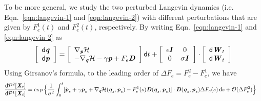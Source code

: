 \documentclass[aip,jcp,a4paper,reprint,onecolumn]{revtex4-1}
\newcommand{\vect}[1]{\textbf{\textit{#1}}}
\newcommand{\dd}{\textsf{d}}
\newcommand{\mh}{\mathcal H}
\begin{document}
To be more general, we study the two perturbed Langevin dynamics
(i.e. Eqn.~\eqref{eqn:langevin-1} and \eqref{eqn:langevin-2}) with
different perturbations that are given by $F_e^1(t)$ and $F_e^2(t)$,
respectively. 
By writing Eqn.~\eqref{eqn:langevin-1} and \eqref{eqn:langevin-2} as
\begin{align}
  \left[
    \begin{array}{l}
      \dd\vect q\\
      \dd\vect p
    \end{array}
  \right]
  =
  \left[
    \begin{array}{l}
      \nabla_{\vect p}\mh\\
      -\nabla_{\vect q}\mh - \gamma\vect p + F_e\vect D
    \end{array}
  \right]
  \dd t
  +
  \left[
    \begin{array}{cc}
      \epsilon \vect I & 0\\
      0 & \sigma\vect I
    \end{array}
  \right]
  \cdot
  \left[
    \begin{array}{l}
      \dd\vect W_t\\
      \dd\vect W_t
    \end{array}
  \right]
\end{align}
Using Girsanov's formula, to the leading order of $\Delta F_e = F_e^2 - F_e^1$,
we have
\begin{align}\label{eqn:girsanov-1}
  \frac{\dd\mathcal P^2[\vect X_t]}{\dd\mathcal P^1[\vect X_t]}
  &=
  \exp
  \Big\{
  \frac 1 {\sigma^2}
  \int_0^t
  [\dot{\vect p}_s +
  \gamma\vect p_s +
  \nabla_{\vect q}\mh(\vect q_s,\vect p_s)
  - F_e^1(s) \vect D(\vect q_s,\vect p_s)
  ]\cdot
  \vect D(\vect q_s,\vect p_s)
  \Delta F_e(s)\,
  \dd s
  + \mathcal O(\Delta F_e^2)
  \Big\} 
\end{align}
\end{document}
